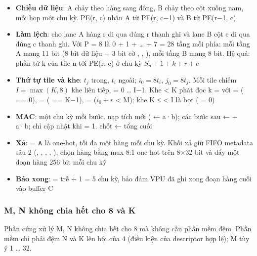 \documentclass[10pt,a4paper]{article}
\begin{document}
\begin{itemize}
\item \textbf{Chiều dữ liệu}: A chảy theo hàng sang đông, B chảy theo cột xuống nam, mỗi hop một chu kỳ. PE(r, c) nhận A từ PE(r, c−1) và B từ PE(r−1, c)
\item \textbf{Làm lệch}:  cho lane A hàng r đi qua đúng r thanh ghi và lane B cột c đi qua đúng c thanh ghi. Với P = 8 là 0 + 1 + … + 7 = 28 tầng mỗi phía: mỗi tầng A mang 11 bit (8 bit dữ liệu + 3 bit cờ , , ), mỗi tầng B mang 8 bit. Hệ quả: phần tử k của tile n tới PE(r, c) ở chu kỳ $S_n + 1 + k + r + c$
\item \textbf{Thứ tự tile và khe}: $t_j$ trong, $t_i$ ngoài; $i_0 = 8 t_i$, $j_0 = 8 t_j$. Mỗi tile chiếm $I = \max(K, 8)$ khe liên tiếp,  = 0 … I−1. Khe  < K phát đọc k =  với  = ( == 0),  = ( == K−1),  = ($i_0 + r$ < M); khe K ≤  < I là bọt ( = 0)
\item \textbf{MAC}: một chu kỳ mỗi bước.  nạp tích mới ( ← a·b); các bước sau  ←  + a·b; chỉ cập nhật khi  = 1.  chốt  ← tổng cuối
\item \textbf{Xả}:  =  ∧  là one-hot, tối đa một hàng mỗi chu kỳ. Khối xả giữ FIFO metadata sâu 2 (, , , , ), chọn hàng bằng mux 8:1 one-hot trên 8×32 bit và đẩy một đoạn hàng 256 bit mỗi chu kỳ
\item \textbf{Báo xong}:  =  trễ  + 1 = 5 chu kỳ, bảo đảm VPU đã ghi xong đoạn hàng cuối vào buffer C
\end{itemize}

\subsubsection{M, N không chia hết cho 8 và K}

\begin{notebox}
Phần cứng xử lý M, N không chia hết cho 8 mà không cần phần mềm đệm. Phần mềm chỉ phải đệm N và K lên bội của 4 (điều kiện của descriptor hợp lệ); M tùy ý 1 … 32.
\end{notebox}
\end{document}
